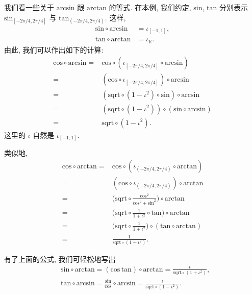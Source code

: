 \begin{example}
    我们看一些关于 $\mathrm{arcsin}$ 跟 $\mathrm{arctan}$ 的等式. 在本例, 我们约定, $\mathrm{sin}$, $\mathrm{tan}$ 分别表示 $\mathrm{sin}_{[-2\pi/4, 2\pi/4]}$ 与 $\mathrm{tan}_{(-2\pi/4, 2\pi/4)}$. 这样,
    \begin{align*}
        \mathrm{sin} \circ \mathrm{arcsin} & = \iota_{[-1, 1]},    \\
        \mathrm{tan} \circ \mathrm{arctan} & = \iota_{\mathbb{R}}.
    \end{align*}
    由此, 我们可以作出如下的计算:
    \begin{align*}
        \mathrm{cos} \circ \mathrm{arcsin}
        = {} & \mathrm{cos} \circ (\iota_{[-2\pi/4, 2\pi/4]} \circ \mathrm{arcsin})           \\
        = {} & (\mathrm{cos} \circ \iota_{[-2\pi/4, 2\pi/4]}) \circ \mathrm{arcsin}           \\
        = {} & (\mathrm{sqrt} \circ (1 - \iota^2) \circ \mathrm{sin}) \circ \mathrm{arcsin}   \\
        = {} & (\mathrm{sqrt} \circ (1 - \iota^2)) \circ (\mathrm{sin} \circ \mathrm{arcsin}) \\
        = {} & \mathrm{sqrt} \circ (1 - \iota^2).
    \end{align*}
    这里的 $\iota$ 自然是 $\iota_{[-1, 1]}$.

    类似地,
    \begin{align*}
        \mathrm{cos} \circ \mathrm{arctan}
        = {} & \mathrm{cos} \circ (\iota_{(-2\pi/4, 2\pi/4)} \circ \mathrm{arctan})                                          \\
        = {} & (\mathrm{cos} \circ \iota_{(-2\pi/4, 2\pi/4)}) \circ \mathrm{arctan}                                          \\
        = {} & \bigg( \mathrm{sqrt} \circ \frac{\mathrm{cos}^2}{\mathrm{cos}^2 + \mathrm{sin}^2}\bigg) \circ \mathrm{arctan} \\
        = {} & \bigg( \mathrm{sqrt} \circ \frac{1}{1 + \iota^2} \circ \mathrm{tan} \bigg) \circ \mathrm{arctan}              \\
        = {} & \bigg( \mathrm{sqrt} \circ \frac{1}{1 + \iota^2} \bigg) \circ (\mathrm{tan} \circ \mathrm{arctan})            \\
        = {} & \frac{1}{\mathrm{sqrt} \circ (1 + \iota^2)}.
    \end{align*}

    有了上面的公式, 我们可轻松地写出
    \begin{align*}
         & \mathrm{sin} \circ \mathrm{arctan} = (\mathrm{cos} \, \mathrm{tan}) \circ \mathrm{arctan} = \frac{\iota}{\mathrm{sqrt} \circ (1 + \iota^2)},    \\
         & \mathrm{tan} \circ \mathrm{arcsin} = \frac{\mathrm{sin}}{\mathrm{cos}} \circ \mathrm{arcsin} = \frac{\iota}{\mathrm{sqrt} \circ (1 - \iota^2)}.
    \end{align*}
\end{example}

